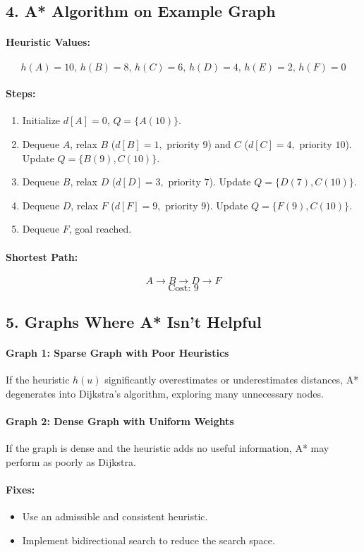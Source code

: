 \documentclass{article}
\begin{document}
\subsection*{4. A* Algorithm on Example Graph}
\paragraph{Heuristic Values:}
\[
h(A) = 10, \, h(B) = 8, \, h(C) = 6, \, h(D) = 4, \, h(E) = 2, \, h(F) = 0
\]

\paragraph{Steps:}
\begin{enumerate}
    \item Initialize \( d[A] = 0 \), \( Q = \{A (10)\} \).
    \item Dequeue \( A \), relax \( B \) (\( d[B] = 1, \text{ priority } 9 \)) and \( C \) (\( d[C] = 4, \text{ priority } 10 \)). Update \( Q = \{B (9), C (10)\} \).
    \item Dequeue \( B \), relax \( D \) (\( d[D] = 3, \text{ priority } 7 \)). Update \( Q = \{D (7), C (10)\} \).
    \item Dequeue \( D \), relax \( F \) (\( d[F] = 9, \text{ priority } 9 \)). Update \( Q = \{F (9), C (10)\} \).
    \item Dequeue \( F \), goal reached.
\end{enumerate}

\paragraph{Shortest Path:}
\[
A \to B \to D \to F
\]
\[
\text{Cost: } 9
\]

\subsection*{5. Graphs Where A* Isn’t Helpful}
\paragraph{Graph 1: Sparse Graph with Poor Heuristics}
If the heuristic \( h(u) \) significantly overestimates or underestimates distances, A* degenerates into Dijkstra’s algorithm, exploring many unnecessary nodes.

\paragraph{Graph 2: Dense Graph with Uniform Weights}
If the graph is dense and the heuristic adds no useful information, A* may perform as poorly as Dijkstra.

\paragraph{Fixes:}
\begin{itemize}
    \item Use an admissible and consistent heuristic.
    \item Implement bidirectional search to reduce the search space.
\end{itemize}
\end{document}
